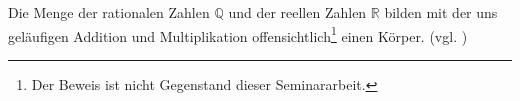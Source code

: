 \theoremstyle{example}
\begin{example}
Die Menge der rationalen Zahlen $\mathbb{Q}$ und der reellen Zahlen $\mathbb{R}$ bilden mit der uns geläufigen Addition und Multiplikation offensichtlich\footnote{Der Beweis ist nicht Gegenstand dieser Seminararbeit.} einen Körper. (vgl. \cite[S. 26]{Beutel})
\end{example}

